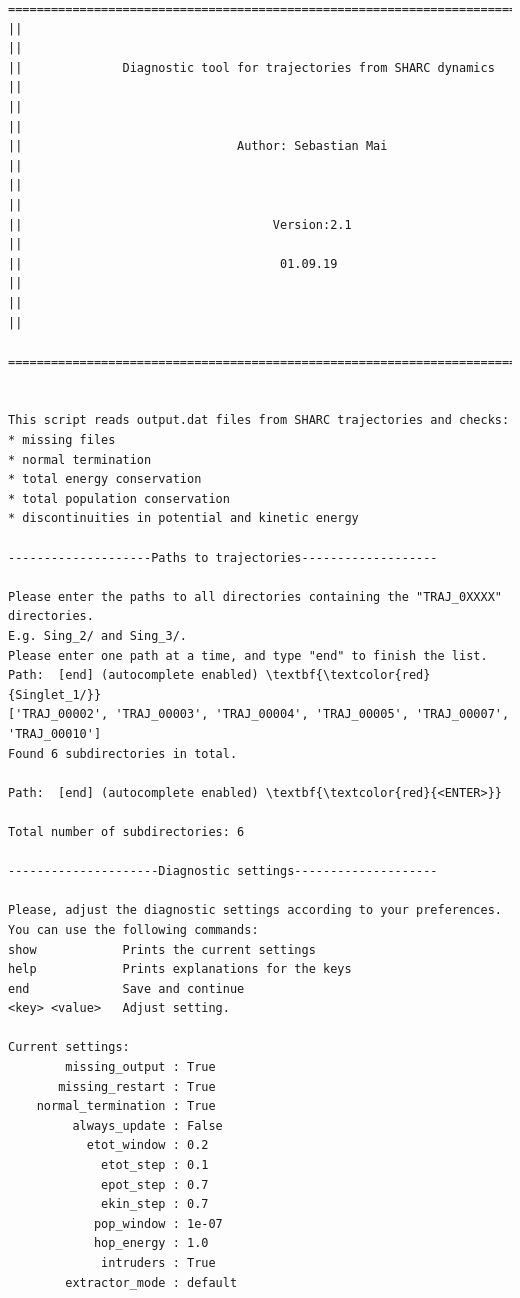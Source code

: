 \documentclass[a4paper,11pt,DIV=15,openany]{scrbook}
\begin{document}
\begin{oframed}
\footnotesize\begin{Verbatim}[commandchars=\\\{\}]
  ================================================================================
||                                                                                ||
||              Diagnostic tool for trajectories from SHARC dynamics              ||
||                                                                                ||
||                              Author: Sebastian Mai                             ||
||                                                                                ||
||                                   Version:2.1                                  ||
||                                    01.09.19                                    ||
||                                                                                ||
  ================================================================================


This script reads output.dat files from SHARC trajectories and checks:
* missing files
* normal termination
* total energy conservation
* total population conservation
* discontinuities in potential and kinetic energy
  
--------------------Paths to trajectories-------------------

Please enter the paths to all directories containing the "TRAJ_0XXXX" directories.
E.g. Sing_2/ and Sing_3/. 
Please enter one path at a time, and type "end" to finish the list.
Path:  [end] (autocomplete enabled) \textbf{\textcolor{red}{Singlet_1/}}
['TRAJ_00002', 'TRAJ_00003', 'TRAJ_00004', 'TRAJ_00005', 'TRAJ_00007', 'TRAJ_00010']
Found 6 subdirectories in total.

Path:  [end] (autocomplete enabled) \textbf{\textcolor{red}{<ENTER>}}

Total number of subdirectories: 6

---------------------Diagnostic settings--------------------

Please, adjust the diagnostic settings according to your preferences.
You can use the following commands:
show            Prints the current settings
help            Prints explanations for the keys
end             Save and continue
<key> <value>   Adjust setting.

Current settings:
        missing_output : True
       missing_restart : True
    normal_termination : True
         always_update : False
           etot_window : 0.2
             etot_step : 0.1
             epot_step : 0.7
             ekin_step : 0.7
            pop_window : 1e-07
            hop_energy : 1.0
             intruders : True
        extractor_mode : default


\end{Verbatim}
\end{oframed}
\end{document}

